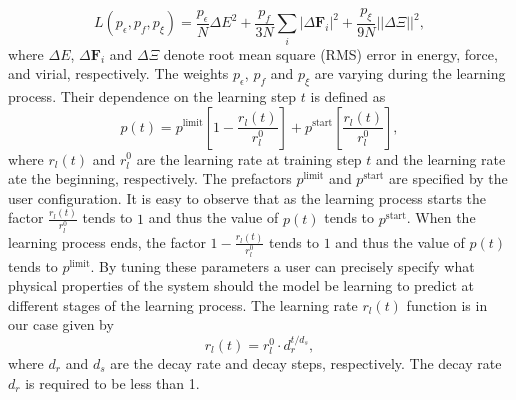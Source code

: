 \begin{equation}
  L(p_\epsilon, p_f, p_\xi) = \frac{p_\epsilon}{N} \Delta E^2 +
  \frac{p_f}{3N} \sum_i |\Delta \mathbf{F}_i|^2
  + \frac{p_\xi}{9N} ||\Delta \Xi||^2,
\end{equation}
where $\Delta E$, $\Delta \mathbf{F}_i$ and $\Delta \Xi$ denote root mean
square (RMS) error in energy, force, and virial, respectively. The weights
$p_\epsilon$, $p_f$ and $p_\xi$ are varying during the learning process. Their
dependence on the learning step $t$ is defined as
\begin{equation}
  p(t) = p^\text{limit} \left[1 - \frac{r_l(t)}{r_l^0}\right]
  + p^\text{start} \left[\frac{r_l(t)}{r_l^0}\right],
  \label{eq:loss-weight}
\end{equation}
where $r_l(t)$ and $r_l^0$ are the learning rate at training step $t$ and the
learning rate ate the beginning, respectively. The prefactors $p^\text{limit}$
and $p^\text{start}$ are specified by the user configuration. It is easy to
observe that as the learning process starts the factor $\frac{r_l(t)}{r_l^0}$
tends to $1$ and thus the value of $p(t)$ tends to $p^\text{start}$. When the
learning process ends, the factor $1 - \frac{r_l(t)}{r_l^0}$ tends to $1$ and
thus the value of $p(t)$ tends to $p^\text{limit}$. By tuning these
parameters a user can precisely specify what physical properties of the system
should the model be learning to predict at different stages of the learning
process. The learning rate $r_l(t)$ function is in our case given by
\begin{equation}
  r_l(t) = r_l^0 \cdot d_r^{t/d_s},
  \label{eq:learning-rate}
\end{equation}
where $d_r$ and $d_s$ are the decay rate and decay steps, respectively. The
decay rate $d_r$ is required to be less than 1.
